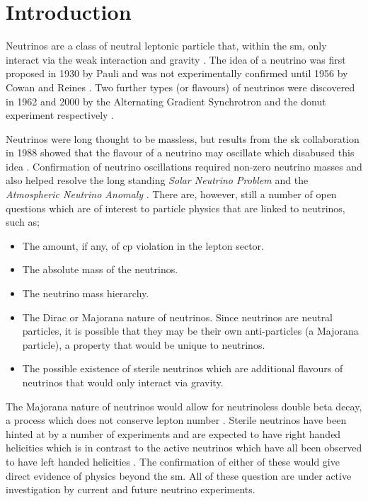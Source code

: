 \chapter{Introduction}
\label{chap:Introduction}


Neutrinos are a class of neutral leptonic particle that, within the \gls{sm}, only interact via the weak interaction and gravity \cite{Particles_and_Fundamental_Interactions:_An_Introduction_to_Particle_Physics}. The idea of a neutrino was first proposed in 1930 by Pauli and was not experimentally confirmed until 1956 by Cowan and Reines \cite{Pauli_letter} \cite{cowan_and_reines_paper}. Two further types (or flavours) of neutrinos were discovered in 1962 and 2000 by the Alternating Gradient Synchrotron and the \Gls{donut} experiment respectively \cite{Muon_neutrino_discovery} \cite{DONUT}. 

Neutrinos were long thought to be massless, but results from the \gls{sk} collaboration in 1988 showed that the flavour of a neutrino may oscillate which disabused this idea \cite{SuperK_neutrino_oscillations}. Confirmation of neutrino oscillations required non-zero neutrino masses and also helped resolve the long standing \textit{Solar Neutrino Problem} and the \textit{Atmospheric Neutrino Anomaly} \cite{Homestake} \cite{Atmospheric_anomaly}. There are, however, still a number of open questions which are of interest to particle physics that are linked to neutrinos, such as; 
\begin{itemize}
    \item The amount, if any, of \gls{cp} violation in the lepton sector.
    \item The absolute mass of the neutrinos.
    \item The neutrino mass hierarchy. 
    \item The Dirac or Majorana nature of neutrinos. Since neutrinos are neutral particles, it is possible that they may be their own anti-particles (a Majorana particle), a property that would be unique to neutrinos. 
    \item The possible existence of sterile neutrinos which are additional flavours of neutrinos that would only interact via gravity. 
\end{itemize}
The Majorana nature of neutrinos would allow for neutrinoless double beta decay, a process which does not conserve lepton number \cite{neutrinoless_double_beta_decay}. Sterile neutrinos have been hinted at by a number of experiments and are expected to have right handed helicities which is in contrast to the active neutrinos which have all been observed to have left handed helicities \cite{White_Paper}. The confirmation of either of these would give direct evidence of physics beyond the \gls{sm}. All of these question are under active investigation by current and future neutrino experiments. 

